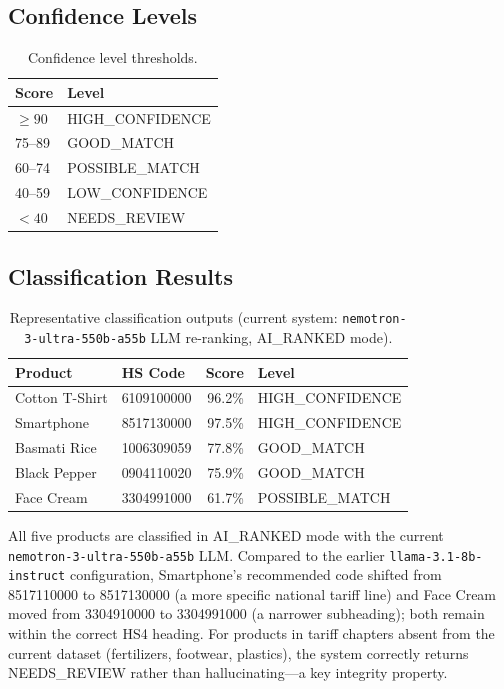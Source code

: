 \documentclass[conference]{IEEEtran}
\begin{document}
\subsection{Confidence Levels}
\begin{table}[h]
\centering
\caption{Confidence level thresholds.}
\label{tab:conf}
\begin{tabular}{@{}ll@{}}
\toprule
\textbf{Score} & \textbf{Level} \\
\midrule
$\geq 90$ & HIGH\_CONFIDENCE \\
75--89    & GOOD\_MATCH \\
60--74    & POSSIBLE\_MATCH \\
40--59    & LOW\_CONFIDENCE \\
$<40$     & NEEDS\_REVIEW \\
\bottomrule
\end{tabular}
\end{table}

\subsection{Classification Results}
\begin{table}[h]
\centering
\caption{Representative classification outputs (current system:
\texttt{nemotron-3-ultra-550b-a55b} LLM re-ranking, AI\_RANKED mode).}
\label{tab:classres}
\begin{tabular}{@{}llrl@{}}
\toprule
\textbf{Product} & \textbf{HS Code} & \textbf{Score} & \textbf{Level} \\
\midrule
Cotton T-Shirt & 6109100000 & 96.2\%  & HIGH\_CONFIDENCE \\
Smartphone     & 8517130000 & 97.5\%  & HIGH\_CONFIDENCE \\
Basmati Rice   & 1006309059 & 77.8\%  & GOOD\_MATCH \\
Black Pepper   & 0904110020 & 75.9\%  & GOOD\_MATCH \\
Face Cream     & 3304991000 & 61.7\%  & POSSIBLE\_MATCH \\
\bottomrule
\end{tabular}
\end{table}
All five products are classified in AI\_RANKED mode with the current
\texttt{nemotron-3-ultra-550b-a55b} LLM. Compared to the earlier
\texttt{llama-3.1-8b-instruct} configuration, Smartphone's recommended
code shifted from 8517110000 to 8517130000 (a more specific national
tariff line) and Face Cream moved from 3304910000 to 3304991000 (a
narrower subheading); both remain within the correct HS4 heading.
For products in tariff chapters absent from the current dataset
(fertilizers, footwear, plastics), the system correctly returns
NEEDS\_REVIEW rather than hallucinating---a key integrity property.
\end{document}
